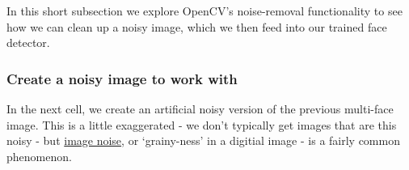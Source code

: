 \documentclass[11pt]{article}
\begin{document}
In this short subsection we explore OpenCV's noise-removal functionality
to see how we can clean up a noisy image, which we then feed into our
trained face detector.

    \hypertarget{create-a-noisy-image-to-work-with}{%
\subsubsection{Create a noisy image to work
with}\label{create-a-noisy-image-to-work-with}}

In the next cell, we create an artificial noisy version of the previous
multi-face image. This is a little exaggerated - we don't typically get
images that are this noisy - but
\href{https://digital-photography-school.com/how-to-avoid-and-reduce-noise-in-your-images/}{image
noise}, or `grainy-ness' in a digitial image - is a fairly common
phenomenon.
\end{document}
